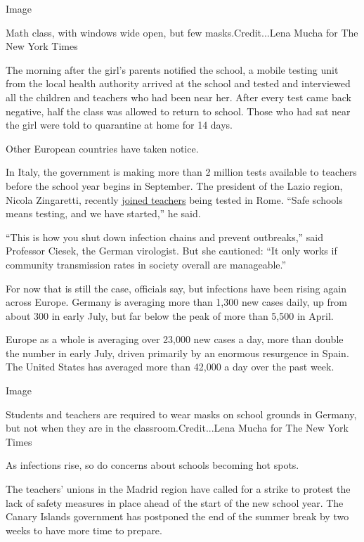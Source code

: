 Image

Math class, with windows wide open, but few masks.Credit...Lena Mucha
for The New York Times

The morning after the girl's parents notified the school, a mobile
testing unit from the local health authority arrived at the school and
tested and interviewed all the children and teachers who had been near
her. After every test came back negative, half the class was allowed to
return to school. Those who had sat near the girl were told to
quarantine at home for 14 days.

Other European countries have taken notice.

In Italy, the government is making more than 2 million tests available
to teachers before the school year begins in September. The president of
the Lazio region, Nicola Zingaretti, recently
\href{https://www.ansa.it/sito/videogallery/italia/2020/08/20/scuola-zingaretti-al-governo-non-unora-vada-perduta_51c086d8-caeb-4e31-bd70-218045277d3b.html}{joined
teachers} being tested in Rome. ``Safe schools means testing, and we
have started,'' he said.

``This is how you shut down infection chains and prevent outbreaks,''
said Professor Ciesek, the German virologist. But she cautioned: ``It
only works if community transmission rates in society overall are
manageable.''

For now that is still the case, officials say, but infections have been
rising again across Europe. Germany is averaging more than 1,300 new
cases daily, up from about 300 in early July, but far below the peak of
more than 5,500 in April.

Europe as a whole is averaging over 23,000 new cases a day, more than
double the number in early July, driven primarily by an enormous
resurgence in Spain. The United States has averaged more than 42,000 a
day over the past week.

Image

Students and teachers are required to wear masks on school grounds in
Germany, but not when they are in the classroom.Credit...Lena Mucha for
The New York Times

As infections rise, so do concerns about schools becoming hot spots.

The teachers' unions in the Madrid region have called for a strike to
protest the lack of safety measures in place ahead of the start of the
new school year. The Canary Islands government has postponed the end of
the summer break by two weeks to have more time to prepare.

